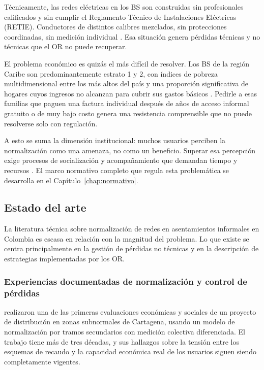 Técnicamente, las redes eléctricas en los BS son construidas sin profesionales calificados y sin cumplir el Reglamento Técnico de Instalaciones Eléctricas (RETIE). Conductores de distintos calibres mezclados, sin protecciones coordinadas, sin medición individual \parencite{SerranoRueda2019, VillagranRomero2022}. Esa situación genera pérdidas técnicas y no técnicas que el OR no puede recuperar.

El problema económico es quizás el más difícil de resolver. Los BS de la región Caribe son predominantemente estrato 1 y 2, con índices de pobreza multidimensional entre los más altos del país y una proporción significativa de hogares cuyos ingresos no alcanzan para cubrir sus gastos básicos \parencite{DANE2024b}. Pedirle a esas familias que paguen una factura individual después de años de acceso informal gratuito o de muy bajo costo genera una resistencia comprensible que no puede resolverse solo con regulación.

A esto se suma la dimensión institucional: muchos usuarios perciben la normalización como una amenaza, no como un beneficio. Superar esa percepción exige procesos de socialización y acompañamiento que demandan tiempo y recursos \parencite{SerranoRueda2019, MendezFuentes2013}. El marco normativo completo que regula esta problemática se desarrolla en el Capítulo~\ref{chap:normativo}.

\subsection{Estado del arte}
\label{subsec:estado_arte}

La literatura técnica sobre normalización de redes en asentamientos informales en Colombia es escasa en relación con la magnitud del problema. Lo que existe se centra principalmente en la gestión de pérdidas no técnicas y en la descripción de estrategias implementadas por los OR.

\subsubsection{Experiencias documentadas de normalización y control de pérdidas}

\textcite{CastilloQuintana1991} realizaron una de las primeras evaluaciones económicas y sociales de un proyecto de distribución en zonas subnormales de Cartagena, usando un modelo de normalización por tramos secundarios con medición colectiva diferenciada. El trabajo tiene más de tres décadas, y sus hallazgos sobre la tensión entre los esquemas de recaudo y la capacidad económica real de los usuarios siguen siendo completamente vigentes.

